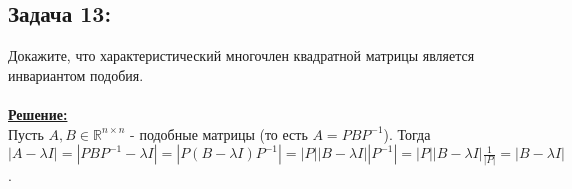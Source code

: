 \documentclass[a4paper,12pt,titlepage,final]{article}
\begin{document}
\subsection*{Задача 13:}
\noindent Докажите, что характеристический многочлен квадратной матрицы является инвариантом подобия. \\ \\
\textbf{\underline{Решение:}} \\
Пусть $A, B \in \mathbb{R}^{n \times n}$ - подобные матрицы (то есть $A = PBP^{-1}$).
Тогда $|A - \lambda I| = |PBP^{-1} - \lambda I| = |P(B - \lambda I)P^{-1}| = 
|P||B - \lambda I||P^{-1}| = |P||B - \lambda I|\frac{1}{|P|} = |B - \lambda I|$. \\ \\ \\
\end{document}
